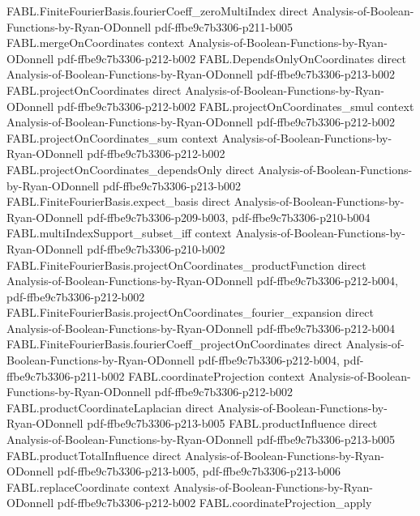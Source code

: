 \begin{theorem}
  {FABL.FiniteFourierBasis.fourierCoeff_zeroMultiIndex}
  {direct}
  {Analysis-of-Boolean-Functions-by-Ryan-ODonnell}
  {pdf-ffbe9c7b3306-p211-b005}
\proofstep
  {FABL.mergeOnCoordinates}
  {context}
  {Analysis-of-Boolean-Functions-by-Ryan-ODonnell}
  {pdf-ffbe9c7b3306-p212-b002}
\proofstep
  {FABL.DependsOnlyOnCoordinates}
  {direct}
  {Analysis-of-Boolean-Functions-by-Ryan-ODonnell}
  {pdf-ffbe9c7b3306-p213-b002}
\proofstep
  {FABL.projectOnCoordinates}
  {direct}
  {Analysis-of-Boolean-Functions-by-Ryan-ODonnell}
  {pdf-ffbe9c7b3306-p212-b002}
\proofstep
  {FABL.projectOnCoordinates_smul}
  {context}
  {Analysis-of-Boolean-Functions-by-Ryan-ODonnell}
  {pdf-ffbe9c7b3306-p212-b002}
\proofstep
  {FABL.projectOnCoordinates_sum}
  {context}
  {Analysis-of-Boolean-Functions-by-Ryan-ODonnell}
  {pdf-ffbe9c7b3306-p212-b002}
\proofstep
  {FABL.projectOnCoordinates_dependsOnly}
  {direct}
  {Analysis-of-Boolean-Functions-by-Ryan-ODonnell}
  {pdf-ffbe9c7b3306-p213-b002}
\proofstep
  {FABL.FiniteFourierBasis.expect_basis}
  {direct}
  {Analysis-of-Boolean-Functions-by-Ryan-ODonnell}
  {pdf-ffbe9c7b3306-p209-b003,
    pdf-ffbe9c7b3306-p210-b004}
\proofstep
  {FABL.multiIndexSupport_subset_iff}
  {context}
  {Analysis-of-Boolean-Functions-by-Ryan-ODonnell}
  {pdf-ffbe9c7b3306-p210-b002}
\proofstep
  {FABL.FiniteFourierBasis.projectOnCoordinates_productFunction}
  {direct}
  {Analysis-of-Boolean-Functions-by-Ryan-ODonnell}
  {pdf-ffbe9c7b3306-p212-b004,
    pdf-ffbe9c7b3306-p212-b002}
\proofstep
  {FABL.FiniteFourierBasis.projectOnCoordinates_fourier_expansion}
  {direct}
  {Analysis-of-Boolean-Functions-by-Ryan-ODonnell}
  {pdf-ffbe9c7b3306-p212-b004}
\proofstep
  {FABL.FiniteFourierBasis.fourierCoeff_projectOnCoordinates}
  {direct}
  {Analysis-of-Boolean-Functions-by-Ryan-ODonnell}
  {pdf-ffbe9c7b3306-p212-b004,
    pdf-ffbe9c7b3306-p211-b002}
\proofstep
  {FABL.coordinateProjection}
  {context}
  {Analysis-of-Boolean-Functions-by-Ryan-ODonnell}
  {pdf-ffbe9c7b3306-p212-b002}
\proofstep
  {FABL.productCoordinateLaplacian}
  {direct}
  {Analysis-of-Boolean-Functions-by-Ryan-ODonnell}
  {pdf-ffbe9c7b3306-p213-b005}
\proofstep
  {FABL.productInfluence}
  {direct}
  {Analysis-of-Boolean-Functions-by-Ryan-ODonnell}
  {pdf-ffbe9c7b3306-p213-b005}
\proofstep
  {FABL.productTotalInfluence}
  {direct}
  {Analysis-of-Boolean-Functions-by-Ryan-ODonnell}
  {pdf-ffbe9c7b3306-p213-b005,
    pdf-ffbe9c7b3306-p213-b006}
\proofstep
  {FABL.replaceCoordinate}
  {context}
  {Analysis-of-Boolean-Functions-by-Ryan-ODonnell}
  {pdf-ffbe9c7b3306-p212-b002}
\proofstep
  {FABL.coordinateProjection_apply}

\end{theorem}
